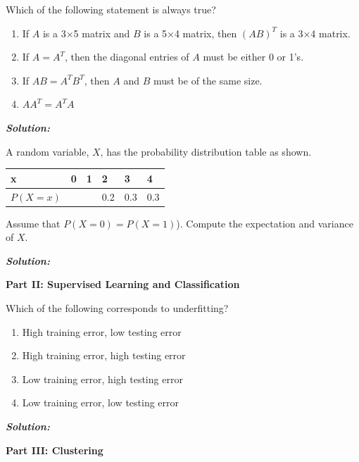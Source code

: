\documentclass[addpoints,12pt]{exam}
\begin{document}
\begin{questions}
\question[1] Which of the following statement is always true?
\begin{enumerate}[label=(\alph*)]
\item If $A$ is a 3×5 matrix and $B$ is a 5×4 matrix, then $(AB)^T$ is a 3×4 matrix.
\item If $A=A^T$, then the diagonal entries of $A$ must be either 0 or 1’s.
\item If $AB=A^TB^T$, then $A$ and $B$ must be of the same size.
\item $AA^T=A^TA$
\end{enumerate}

\textbf{\textit{{\color{coral} Solution:}}}


\question[1] A random variable, $X$, has the probability distribution table as shown.

\begin{table}[h]
\begin{tabular}{|l|l|l|l|l|l|}
\hline
\textit{}  x & 0 & 1 & 2 & 3 & 4 \\ \hline
         $P(X=x)$ &  &  & 0.2 & 0.3 & 0.3 \\ \hline
\end{tabular}
\end{table}

Assume that $P(X=0)=P(X=1)$). Compute the expectation and variance of $X$. 

\textbf{\textit{{\color{coral} Solution:}}}

\hspace{-0.25in}\noindent\textbf{{\large Part II: Supervised Learning and Classification}}

\question[1] Which of the following corresponds to underfitting?

\begin{enumerate}[label=(\alph*)]
\item High training error, low testing error
\item High training error, high testing error
\item Low training error, high testing error
\item Low training error, low testing error
\end{enumerate}


\textbf{\textit{{\color{coral} Solution:}}}


\hspace{-0.25in}\noindent\textbf{{\large Part III: Clustering}}


\end{questions}
\end{document}
